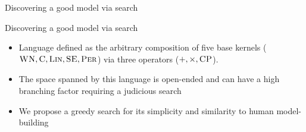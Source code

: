 \begin{frame}{Discovering a good model via search}
  
\end{frame}

\begin{frame}{Discovering a good model via search}
  \begin{itemize}
    \item Language defined as the arbitrary composition of five base kernels (${\textsc{WN}}, {\textsc{C}}, {\textsc{Lin}}, {\textsc{SE}}, {\textsc{Per}}$) via three operators ($+, \times, {\textsc{CP}}$). 
    \vspace{\baselineskip}
    \item The space spanned by this language is open-ended and can have a high branching factor requiring a judicious search
    \vspace{\baselineskip}
    \item We propose a greedy search for its simplicity and similarity to human model-building
  \end{itemize}
\end{frame}

